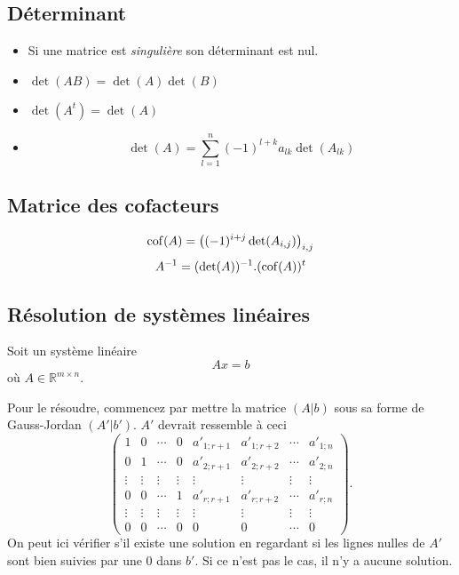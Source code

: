 \subsection{Déterminant}
\begin{itemize}
  \item Si une matrice est \emph{singulière} son déterminant est nul.
  \item $\det(AB) = \det(A) \det(B)$
  \item $\det(A^t) = \det(A)$
  \item \[ \det(A) = \sum_{l = 1}^{n}(-1)^{l+k}a_{lk}\det(A_{lk}) \]
\end{itemize}

\subsection{Matrice des cofacteurs}
\[ \operatorname{cof}(A) = \left((-1)^{i + j}\det(A_{i,j})\right)_{i,j} \]
\[ A^{-1} = (\det(A))^{-1} . (\operatorname{cof}(A))^t \]

\subsection{Résolution de systèmes linéaires}
\label{sec:solvelinsys}
Soit un système linéaire
\[ A x = b \]
où $A \in \mathbb{R}^{m \times n}$.

Pour le résoudre, commencez par mettre la matrice $(A|b)$
sous sa forme de Gauss-Jordan $(A'|b')$.
$A'$ devrait ressemble à ceci
\[ \begin{pmatrix}
    1 & 0 & \cdots & 0 & a'_{1;r+1} & a'_{1;r+2} & \cdots & a'_{1;n}\\
    0 & 1 & \cdots & 0 & a'_{2;r+1} & a'_{2;r+2} & \cdots & a'_{2;n}\\
    \vdots & \vdots & \vdots & \vdots &
    \vdots & \vdots & \vdots & \vdots\\
    0 & 0 & \cdots & 1 & a'_{r;r+1} & a'_{r;r+2} & \cdots & a'_{r;n}\\
    \vdots & \vdots & \vdots & \vdots &
    \vdots & \vdots & \vdots & \vdots\\
    0 & 0 & \cdots & 0 & 0 & 0 & \cdots & 0
\end{pmatrix}. \]
On peut ici vérifier s'il existe une solution en regardant si les lignes
nulles de $A'$ sont bien suivies par une 0 dans $b'$.
Si ce n'est pas le cas, il n'y a aucune solution.


